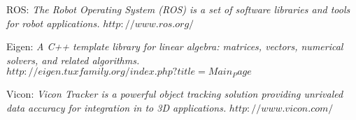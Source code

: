 \begin{thebibliography}{99}
 {\sc ROS}: 
{\it The Robot Operating System (ROS) is a set of software libraries and tools for robot applications.}\newline
\href{http://www.ros.org/}{$http://www.ros.org/$}

 {\sc Eigen}: 
{\it  A C++ template library for linear algebra: matrices, vectors, numerical solvers, and related algorithms.}\newline
\href{http://eigen.tuxfamily.org/index.php?title=Main_Page}{$http://eigen.tuxfamily.org/index.php?title=Main_Page$}

 {\sc Vicon}: 
{\it Vicon Tracker is a powerful object tracking solution providing unrivaled data accuracy for integration in to 3D applications.}\newline
\href{http://www.vicon.com/}{$http://www.vicon.com/$}

\end{thebibliography}
